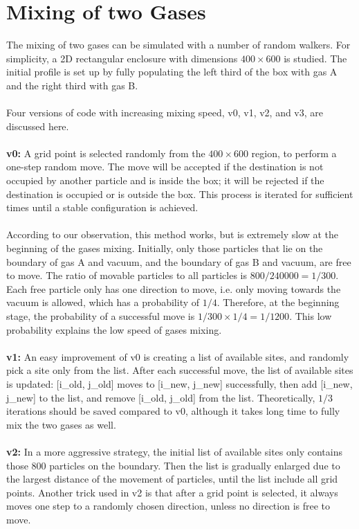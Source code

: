 \documentclass{article}
\begin{document}
\section{Mixing of two Gases}
The mixing of two gases can be simulated with a number of random walkers. For simplicity, a 2D rectangular enclosure with dimensions $400 \times 600$ is studied. The initial profile is set up by fully populating the left third of the box with gas A and the right third with gas B.\\
\\
Four versions of code with increasing mixing speed, v0, v1, v2, and v3, are discussed here.\\
\\
\textbf{v0:}  A grid point is selected randomly from the $400 \times 600$ region, to perform a one-step random move. The move will be accepted if the destination is not occupied by another particle and is inside the box; it will be rejected if the destination is occupied or is outside the box. This process is iterated for sufficient times until a stable configuration is achieved.\\
\\
According to our observation, this method works, but is extremely slow at the beginning of the gases mixing. Initially, only those particles that lie on the boundary of gas A and vacuum, and the boundary of gas B and vacuum, are free to move. The ratio of movable particles to all particles is $800/240000 = 1/300$. Each free particle only has one direction to move, i.e. only moving towards the vacuum is allowed, which has a probability of $1/4$. Therefore, at the beginning stage, the probability of a successful move is $1/300 \times 1/4 = 1/1200$. This low probability explains the low speed of gases mixing.\\
\\
\textbf{v1:}  An easy improvement of v0 is creating a list of available sites, and randomly pick a site only from the list. After each successful move, the list of available sites is updated: [i\_old, j\_old] moves to [i\_new, j\_new] successfully, then add [i\_new, j\_new] to the list, and remove [i\_old, j\_old] from the list. Theoretically, $1/3$ iterations should be saved compared to v0, although it takes long time to fully mix the two gases as well.\\
\\
\textbf{v2:}  In a more aggressive strategy, the initial list of available sites only contains those 800 particles on the boundary. Then the list is gradually enlarged due to the largest distance of the movement of particles, until the list include all grid points. Another trick used in v2 is that after a grid point is selected, it always moves one step to a randomly chosen direction, unless no direction is free to move.\\
\end{document}
